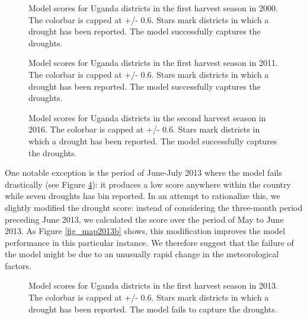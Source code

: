 \documentclass[10pt,parskip=half,
toc=sectionentrywithdots,
bibliography=totocnumbered,
captions=tableheading,numbers=noendperiod]{scrartcl}
\begin{document}
\begin{figure}[H]\begin{center}\end{center}\caption{Model scores for Uganda districts in the first harvest season in 2000.
The colorbar is capped at +/- 0.6. Stars mark districts in which a
drought has been reported. The model successfully captures the droughts.}\label{fig_map2000}\end{figure}

\begin{figure}[H]\begin{center}\end{center}\caption{Model scores for Uganda districts in the first harvest season in 2011.
The colorbar is capped at +/- 0.6. Stars mark districts in which a
drought has been reported. The model successfully captures the droughts.}\label{fig_map2011}\end{figure}

\begin{figure}[H]\begin{center}\end{center}\caption{Model scores for Uganda districts in the second harvest season in 2016.
The colorbar is capped at +/- 0.6. Stars mark districts in which a
drought has been reported. The model successfully captures the droughts.}\label{fig_map2016}\end{figure}

One notable exception is the period of June-July 2013 where the model
fails drastically (see Figure \ref{fig_map2013a}): it produces a low
score anywhere within the country while seven droughts has bin reported.
In an attempt to rationalize this, we slightly modified the drought
score: instead of considering the three-month period preceding June
2013, we calculated the score over the period of May to June 2013. As
Figure \ref{fig_map2013b} shows, this modification improves the model
performance in this particular instance. We therefore suggest that the
failure of the model might be due to an unusually rapid change in the
meteorological factors.

\begin{figure}[H]\begin{center}\end{center}\caption{Model scores for Uganda districts in the first harvest season in 2013.
The colorbar is capped at +/- 0.6. Stars mark districts in which a
drought has been reported. The model fails to capture the droughts.}\label{fig_map2013a}\end{figure}
\end{document}
